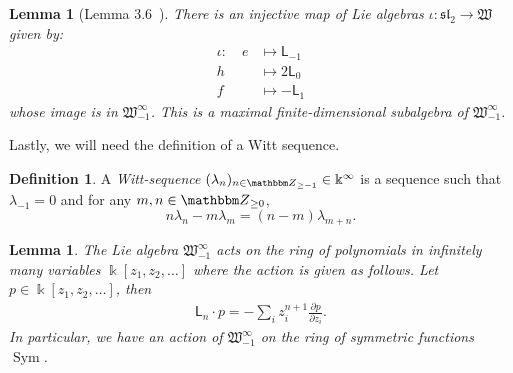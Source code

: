 \documentclass{amsart}
\numberwithin{equation}{section}
\newtheorem{lemma}[thm]{Lemma}
\theoremstyle{definition}
\newtheorem{definition}[thm]{Definition}
\def\Z{{\mathbbm Z}}
\renewcommand{\to}{\rightarrow}
\newcommand{\maps}{\colon}
\newcommand{\Sym}{\operatorname{Sym}}
\newcommand{\witt}{{\mathfrak{W}}}
\newcommand{\LLn}[1][n]{{\mathsf{L}_{#1}}}
\newcommand{\ourwitt}{{\witt_{-1}^{\infty}}}
\begin{document}
\begin{lemma}[Lemma 3.6~\cite{qi2024symmetriesmathfrakglnfoams}] \label{lem:wittsl2}
There is an injective map of Lie algebras $\iota \maps \mathfrak{sl}_2 \to \witt$ given by:
  \label{lem:sl2-to-witt}
  \begin{align*}
    \iota: \quad
    e &\mapsto \LLn[-1] \\
    h &\mapsto 2\LLn[0] \\
    f &\mapsto -\LLn[1]
  \end{align*}
 whose
  image is in $\ourwitt$.  This is a maximal finite-dimensional subalgebra of $\ourwitt$.  
\end{lemma}

Lastly, we will need the definition of a Witt sequence.
\begin{definition}
  A \emph{Witt-sequence} $(\lambda_n)_{n \in \Z_{\geq -1}} \in \Bbbk^{\infty}$ is a sequence such that $\lambda_{-1}=0$ and for any  $m,n \in \Z_{\geq 0}$,
  \begin{equation*}
n\lambda_{n} - m\lambda_{m}  = (n-m)\lambda_{m+n}.
\end{equation*}
\end{definition}

\begin{lemma}\label{actiononpoly}
The Lie algebra $\ourwitt$ acts on the ring of polynomials in infinitely many variables $\Bbbk[z_1, z_2, \dots]$ where the action is given as follows. Let $p \in \Bbbk[z_1, z_2, \dots]$, then
\begin{align*}
  \LLn \cdot p = -\sum_{i}
  z_i^{n+1}\frac{\partial p}{\partial z_i}.
\end{align*}
In particular, we have an action of $\ourwitt$ on the ring of symmetric functions $\Sym$.
\end{lemma}
\end{document}
